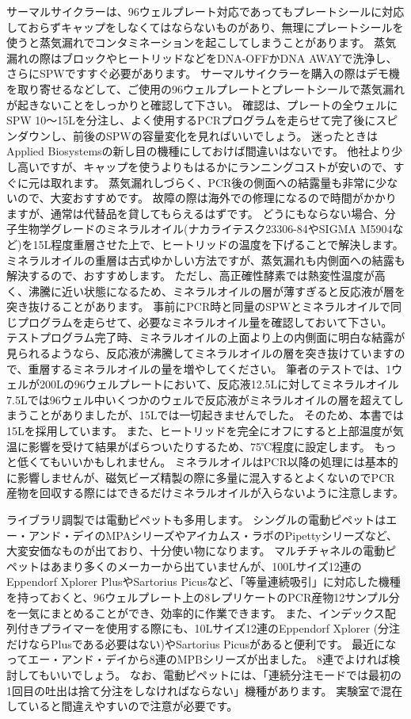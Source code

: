\documentclass[titlepage,10pt,a4paper,uplatex]{jsbook}
\begin{document}
サーマルサイクラーは、96ウェルプレート対応であってもプレートシールに対応しておらずキャップをしなくてはならないものがあり、無理にプレートシールを使うと蒸気漏れでコンタミネーションを起こしてしまうことがあります。
蒸気漏れの際はブロックやヒートリッドなどをDNA-OFFかDNA AWAYで洗浄し、さらにSPWですすぐ必要があります。
サーマルサイクラーを購入の際はデモ機を取り寄せるなどして、ご使用の96ウェルプレートとプレートシールで蒸気漏れが起きないことをしっかりと確認して下さい。
確認は、プレートの全ウェルにSPW 10～15{\textmu}Lを分注し、よく使用するPCRプログラムを走らせて完了後にスピンダウンし、前後のSPWの容量変化を見ればいいでしょう。
迷ったときはApplied Biosystemsの新し目の機種にしておけば間違いはないです。
他社より少し高いですが、キャップを使うよりもはるかにランニングコストが安いので、すぐに元は取れます。
蒸気漏れしづらく、PCR後の側面への結露量も非常に少ないので、大変おすすめです。
故障の際は海外での修理になるので時間がかかりますが、通常は代替品を貸してもらえるはずです。
どうにもならない場合、分子生物学グレードのミネラルオイル(ナカライテスク23306-84やSIGMA M5904など)を15{\textmu}L程度重層させた上で、ヒートリッドの温度を下げることで解決します。
ミネラルオイルの重層は古式ゆかしい方法ですが、蒸気漏れも内側面への結露も解決するので、おすすめします。
ただし、高正確性酵素では熱変性温度が高く、沸騰に近い状態になるため、ミネラルオイルの層が薄すぎると反応液が層を突き抜けることがあります。
事前にPCR時と同量のSPWとミネラルオイルで同じプログラムを走らせて、必要なミネラルオイル量を確認しておいて下さい。
テストプログラム完了時、ミネラルオイルの上面より上の内側面に明白な結露が見られるようなら、反応液が沸騰してミネラルオイルの層を突き抜けていますので、重層するミネラルオイルの量を増やしてください。
筆者のテストでは、1ウェルが200{\textmu}Lの96ウェルプレートにおいて、反応液12.5{\textmu}Lに対してミネラルオイル7.5{\textmu}Lでは96ウェル中いくつかのウェルで反応液がミネラルオイルの層を超えてしまうことがありましたが、15{\textmu}Lでは一切起きませんでした。
そのため、本書では15{\textmu}Lを採用しています。
また、ヒートリッドを完全にオフにすると上部温度が気温に影響を受けて結果がばらついたりするため、75℃程度に設定します。
もっと低くてもいいかもしれません。
ミネラルオイルはPCR以降の処理には基本的に影響しませんが、磁気ビーズ精製の際に多量に混入するとよくないのでPCR産物を回収する際にはできるだけミネラルオイルが入らないように注意します。

ライブラリ調製では電動ピペットも多用します。
シングルの電動ピペットはエー・アンド・デイのMPAシリーズやアイカムス・ラボのPipettyシリーズなど、大変安価なものが出ており、十分使い物になります。
マルチチャネルの電動ピペットはあまり多くのメーカーから出ていませんが、100{\textmu}Lサイズ12連のEppendorf Xplorer PlusやSartorius Picusなど、「等量連続吸引」に対応した機種を持っておくと、96ウェルプレート上の8レプリケートのPCR産物12サンプル分を一気にまとめることができ、効率的に作業できます。
また、インデックス配列付きプライマーを使用する際にも、10{\textmu}Lサイズ12連のEppendorf Xplorer (分注だけならPlusである必要はない)やSartorius Picusがあると便利です。
最近になってエー・アンド・デイから8連のMPBシリーズが出ました。
8連でよければ検討してもいいでしょう。
なお、電動ピペットには、「連続分注モードでは最初の1回目の吐出は捨て分注をしなければならない」機種があります。
実験室で混在していると間違えやすいので注意が必要です。
\end{document}
